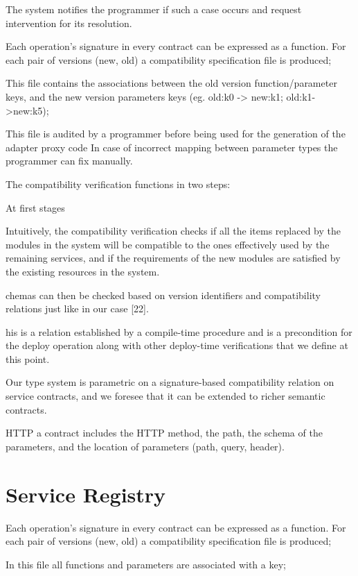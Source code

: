 The system notifies the programmer if such a case occurs and request intervention for its resolution.


Each operation's signature in every contract can be expressed as a function.
For each pair of versions (new, old) a compatibility specification file is produced;

This file contains the associations between the old version function/parameter keys, and the new version parameters keys (eg. old:k0 -> new:k1; old:k1->new:k5);

This file is audited by a programmer before being used for the generation of the adapter proxy code
In case of incorrect mapping between parameter types the programmer can fix manually.







The compatibility verification functions in two steps:

At first stages

Intuitively, the compatibility verification checks if all the items replaced
by the modules in the system will be compatible to the ones effectively used by the
remaining services, and if the requirements of the new modules are satisfied by the
existing resources in the system.

chemas can then be checked based
on version identifiers and compatibility relations just like in our case [22].

his is a relation established by
a compile-time procedure and is a precondition for the deploy operation along with
other deploy-time verifications that we define at this point.

Our type system is parametric on
a signature-based compatibility relation on service contracts, and we foresee that it
can be extended to richer semantic contracts.

HTTP a contract includes the HTTP method, the path, the schema of the parameters, and the location of parameters (path, query, header).

\section{Service Registry} %
\label{sec:service_registry}

Each operation's signature in every contract can be expressed as a function.
For each pair of versions (new, old) a compatibility specification file is produced;

In this file all functions and parameters are associated with a key;

